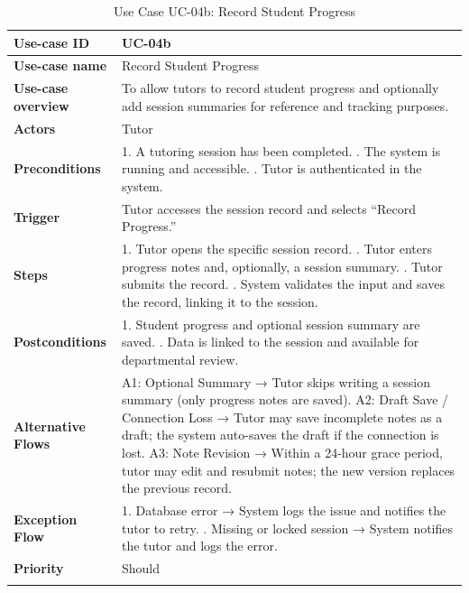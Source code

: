 \begin{center}
\begin{longtable}{|p{3cm}|p{11cm}|}
\hline
\textbf{Use-case ID} & UC-04b \\
\hline
\textbf{Use-case name} & Record Student Progress \\
\hline
\textbf{Use-case overview} & To allow tutors to record student progress and optionally add session summaries for reference and tracking purposes. \\
\hline
\textbf{Actors} & Tutor \\
\hline
\textbf{Preconditions} & 
1. A tutoring session has been completed. \newline
2. The system is running and accessible. \newline
3. Tutor is authenticated in the system. \\
\hline
\textbf{Trigger} & Tutor accesses the session record and selects “Record Progress.” \\
\hline
\textbf{Steps} & 
1. Tutor opens the specific session record. \newline
2. Tutor enters progress notes and, optionally, a session summary. \newline
3. Tutor submits the record. \newline
4. System validates the input and saves the record, linking it to the session. \\
\hline
\textbf{Postconditions} & 
1. Student progress and optional session summary are saved. \newline
2. Data is linked to the session and available for departmental review. \\
\hline
\textbf{Alternative Flows} & 
A1: Optional Summary → Tutor skips writing a session summary (only progress notes are saved). \newline
A2: Draft Save / Connection Loss → Tutor may save incomplete notes as a draft; the system auto-saves the draft if the connection is lost. \newline
A3: Note Revision → Within a 24-hour grace period, tutor may edit and resubmit notes; the new version replaces the previous record. \\
\hline
\textbf{Exception Flow} & 
1. Database error → System logs the issue and notifies the tutor to retry. \newline
2. Missing or locked session → System notifies the tutor and logs the error. \\
\hline
\textbf{Priority} & Should \\
\hline
\caption{Use Case UC-04b: Record Student Progress}
\end{longtable}
\end{center}

